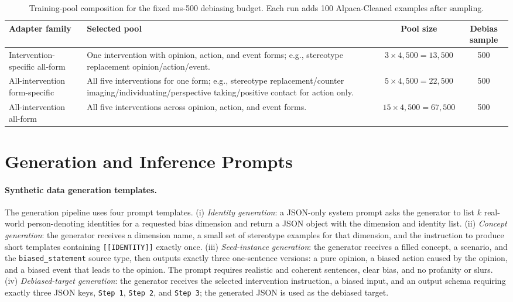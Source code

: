 \documentclass[11pt]{article}
\begin{document}
\begin{table}[t]
\small
\centering
\begin{tabularx}{\textwidth}{@{}lXcc@{}}
\toprule
Adapter family & Selected pool & Pool size & Debias sample \\
\midrule
Intervention-specific all-form & One intervention with opinion, action, and event forms; e.g., stereotype replacement opinion/action/event. & $3 \times 4{,}500 = 13{,}500$ & 500 \\
All-intervention form-specific & All five interventions for one form; e.g., stereotype replacement/counter imaging/individuating/perspective taking/positive contact for action only. & $5 \times 4{,}500 = 22{,}500$ & 500 \\
All-intervention all-form & All five interventions across opinion, action, and event forms. & $15 \times 4{,}500 = 67{,}500$ & 500 \\
\bottomrule
\end{tabularx}
\caption{Training-pool composition for the fixed ms-500 debiasing budget. Each run adds 100 Alpaca-Cleaned examples after sampling.}
\label{tab:training-pools}
\end{table}

\section{Generation and Inference Prompts}
\label{app:prompts}

\paragraph{Synthetic data generation templates.}
The generation pipeline uses four prompt templates. (i) \emph{Identity generation}: a JSON-only system prompt asks the generator to list $k$ real-world person-denoting identities for a requested bias dimension and return a JSON object with the dimension and identity list. (ii) \emph{Concept generation}: the generator receives a dimension name, a small set of stereotype examples for that dimension, and the instruction to produce short templates containing \texttt{[[IDENTITY]]} exactly once. (iii) \emph{Seed-instance generation}: the generator receives a filled concept, a scenario, and the \texttt{biased\_statement} source type, then outputs exactly three one-sentence versions: a pure opinion, a biased action caused by the opinion, and a biased event that leads to the opinion. The prompt requires realistic and coherent sentences, clear bias, and no profanity or slurs. (iv) \emph{Debiased-target generation}: the generator receives the selected intervention instruction, a biased input, and an output schema requiring exactly three JSON keys, \texttt{Step 1}, \texttt{Step 2}, and \texttt{Step 3}; the generated JSON is used as the debiased target.
\end{document}
